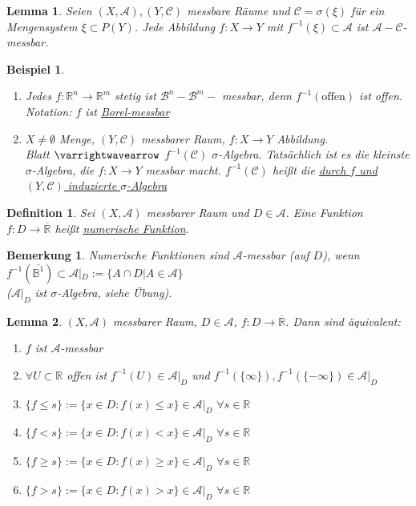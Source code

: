 \documentclass[11pt]{memoir}
\theoremstyle{break}
\newtheorem{Definition}{Definition}[chapter]
\newtheorem{Bemerkung}{Bemerkung}[chapter]
\newtheorem{Beispiel}{Beispiel}[chapter]
\newtheorem{Lemma}{Lemma}[chapter]
\begin{document}
\begin{Lemma}
Seien $(X, \mathscr{A}), (Y, \mathscr{C})$ messbare Räume und $\mathscr{C} = \sigma(\xi)$ für ein Mengensystem $\xi \subset P(Y)$. Jede Abbildung $f: X \rightarrow Y$ mit $f^{-1}(\xi) \subset \mathscr{A}$ ist $\mathscr{A}-\mathscr{C}$-messbar.
\end{Lemma}

\begin{Beispiel}
\begin{enumerate}
	\item Jedes $f: \mathbb{R}^n \rightarrow \mathbb{R}^m$ stetig ist $\mathscr{B}^n-\mathscr{B}^m-$ messbar, denn $f^{-1}(\text{offen})$ ist offen. \\
	\emph{Notation}: $f$ ist \underline{Borel-messbar} 
	\item $X \ne \emptyset$ Menge, $(Y, \mathscr{C})$ messbarer Raum, $f: X \rightarrow Y$ Abbildung. \\
	Blatt $\varrightwavearrow$ $f^{-1}(\mathscr{C})$ $\sigma$-Algebra. Tatsächlich ist es die kleinste $\sigma$-Algebra, die $f: X \rightarrow Y$ messbar macht. $f^{-1}(\mathscr{C})$ heißt die \underline{durch $f$ und $(Y, \mathscr{C})$ induzierte $\sigma$-Algebra}
\end{enumerate}
\end{Beispiel}

\begin{Definition}
Sei $(X, \mathscr{A})$ messbarer Raum und $D \in \mathscr{A}$. Eine Funktion $f: D \rightarrow \overline{\mathbb{R}}$ heißt \underline{numerische Funktion}.
\end{Definition}

\begin{Bemerkung}
Numerische Funktionen sind $\mathscr{A}$-messbar (auf $D$), wenn $f^{-1}(\overline{\mathbb{B}^1}) \subset \mathscr{A}|_D:= \{A \cap D |A \in \mathscr{A}\}$ \\
($\mathscr A | _D$ ist $\sigma$-Algebra, siehe Übung).
\end{Bemerkung}

\begin{Lemma}
$(X, \mathscr A)$ messbarer Raum, $D \in \mathscr A$, $f: D \rightarrow \overline {\mathbb R}$. Dann sind äquivalent:
\begin{enumerate}
	\item $f$ ist $\mathscr A$-messbar
	\item $\forall U \subset \mathbb R$ offen ist $f^{-1}(U) \in \mathscr A |_D$ und $f^{-1}(\{\infty\}), f^{-1}(\{-\infty\}) \in \mathscr A |_D$
	\item $\{f \leq s\} := \{x \in D: f(x) \leq x\} \in \mathscr A |_D$ $ \forall s \in \mathbb R$
	\item $\{f < s\} := \{x \in D: f(x) < x\} \in \mathscr A |_D$ $ \forall s \in \mathbb R$
	\item $\{f \geq s\} := \{x \in D: f(x) \geq x\} \in \mathscr A |_D$ $ \forall s \in \mathbb R$
	\item $\{f > s\} := \{x \in D: f(x) > x\} \in \mathscr A |_D$ $ \forall s \in \mathbb R$
\end{enumerate}
\end{Lemma}
\end{document}
